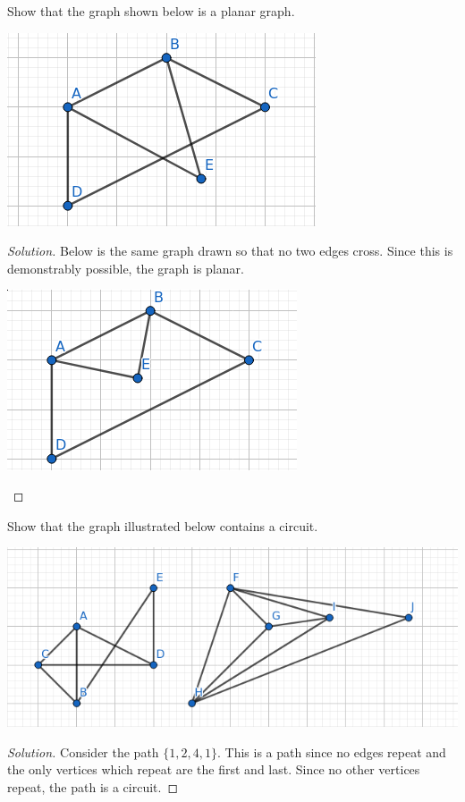 \documentclass[12pt]{article}
\newenvironment{exercise}[2][Exercise]{\begin{trivlist}
        \item[\hskip \labelsep {\bfseries #1}\hskip \labelsep {\bfseries #2.}]}{\end{trivlist}}
\newenvironment{solution}
        {\begin{proof}[Solution]}
                    {\end{proof}}
\begin{document}
\begin{exercise}{49}
    Show that the graph shown below is a planar graph.
    \begin{center}
        \includegraphics[width=.5\linewidth]{49-1}
    \end{center}
    \begin{solution}
        Below is the same graph drawn so that no two edges cross. Since this is demonstrably possible, the graph is planar.
    \begin{center}
        \includegraphics[width=.5\linewidth]{49-2}
    \end{center}
    \end{solution}
\end{exercise}

\begin{exercise}{50}
    Show that the graph illustrated below contains a circuit.
    \begin{center}
        \includegraphics[width=.5\linewidth]{48}
    \end{center}
    \begin{solution}
        Consider the path \( \{1,2,4,1\} . \) This is a path since no edges repeat and the only vertices which repeat are the first and last. Since no other vertices repeat, the path is a circuit.
    \end{solution}
\end{exercise}
\end{document}
